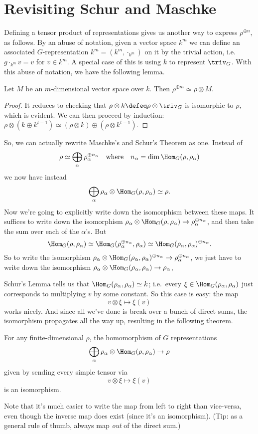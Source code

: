 \section{Revisiting Schur and Maschke}
Defining a tensor product of representations gives us another way to express $\rho^{\oplus n}$, as follows.
By an abuse of notation, given a vector space $k^m$ we can define an associated $G$-representation $k^m = (k^m, \cdot_{k^m})$ on it by the trivial action, i.e.  $g \cdot_{k^m} v = v$ for $v \in k^m$.
A special case of this is using $k$ to represent $\triv_G$.
With this abuse of notation, we have the following lemma.
\begin{lemma}
	Let $M$ be an $m$-dimensional vector space over $k$.
	Then $\rho^{\oplus m} \simeq \rho \otimes M$.
\end{lemma}
\begin{proof}
	It reduces to checking that $\rho \otimes k \defeq \rho \otimes \triv_G$ is isomorphic to $\rho$, which is evident.
	We can then proceed by induction: $\rho \otimes (k \oplus k^{t-1})
	\simeq (\rho \otimes k) \oplus (\rho \otimes k^{t-1})$.
\end{proof}
So, we can actually rewrite Maschke's and Schur's Theorem as one.
Instead of
\[ \rho \simeq \bigoplus_\alpha \rho_\alpha^{\oplus n_\alpha} 
\quad\text{where}\quad
n_\alpha = \dim \Hom_G(\rho, \rho_\alpha) \]
we now have instead
\[
	\bigoplus_\alpha \rho_\alpha \otimes \Hom_G(\rho, \rho_\alpha)
	\simeq \rho.
\]
Now we're going to explicitly write down the isomorphism between these maps.
It suffices to write down the isomorphism
$\rho_\alpha \otimes \Hom_G(\rho, \rho_\alpha) \to \rho_\alpha^{\oplus n_\alpha}$, and then take the sum over each of the $\alpha$'s.
But \[ \Hom_G(\rho, \rho_\alpha) \simeq \Hom_G(\rho_\alpha^{\oplus n_\alpha}, \rho_\alpha) \simeq \Hom_G(\rho_\alpha, \rho_\alpha)^{\oplus n_\alpha}. \]
So to write the isomorphism $\rho_\alpha \otimes \Hom_G(\rho_\alpha, \rho_\alpha)^{\oplus n_\alpha} \to \rho_\alpha^{\oplus n_\alpha}$,
we just have to write down the isomorphism
$\rho_\alpha \otimes \Hom_G(\rho_\alpha, \rho_\alpha) \to \rho_\alpha$,

Schur's Lemma tells us that $\Hom_G(\rho_\alpha, \rho_\alpha) \simeq k$; i.e.\ every $\xi \in \Hom_G(\rho_\alpha, \rho_\alpha)$ just corresponds to multiplying $v$ by some constant.
So this case is easy: the map \[ v \otimes \xi \mapsto \xi(v) \]
works nicely.
And since all we've done is break over a bunch of direct sums, the isomorphism propagates all the way up, resulting in the following theorem.
\begin{theorem}
	For any finite-dimensional $\rho$, the homomorphism of $G$ representations
	\[ 
	\bigoplus_\alpha \rho_\alpha \otimes \Hom_G(\rho, \rho_\alpha)
	\to \rho
	\]
	given by sending every simple tensor via
	\[ v \otimes \xi \mapsto \xi(v) \]
	is an isomorphism.
\end{theorem}
Note that it's much easier to write the map from left to right than vice-versa, even though the inverse map does exist (since it's an isomorphism).
(Tip: as a general rule of thumb, always map \emph{out} of the direct sum.)

